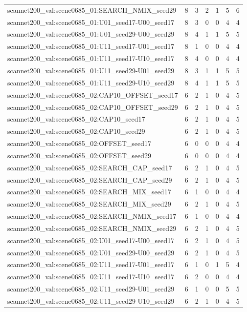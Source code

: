 \begin{table}[t]
\begin{tabular}{lrrrrrr}
scannet200\_val:scene0685\_01:SEARCH\_NMIX\_seed29 & 8 & 3 & 2 & 1 & 5 & 6 \\
scannet200\_val:scene0685\_01:U01\_seed17-U00\_seed17 & 8 & 3 & 0 & 0 & 4 & 4 \\
scannet200\_val:scene0685\_01:U01\_seed29-U00\_seed29 & 8 & 4 & 1 & 1 & 5 & 5 \\
scannet200\_val:scene0685\_01:U11\_seed17-U01\_seed17 & 8 & 1 & 0 & 0 & 4 & 4 \\
scannet200\_val:scene0685\_01:U11\_seed17-U10\_seed17 & 8 & 4 & 0 & 0 & 4 & 4 \\
scannet200\_val:scene0685\_01:U11\_seed29-U01\_seed29 & 8 & 3 & 1 & 1 & 5 & 5 \\
scannet200\_val:scene0685\_01:U11\_seed29-U10\_seed29 & 8 & 4 & 1 & 1 & 5 & 5 \\
scannet200\_val:scene0685\_02:CAP10\_OFFSET\_seed17 & 6 & 2 & 1 & 0 & 4 & 5 \\
scannet200\_val:scene0685\_02:CAP10\_OFFSET\_seed29 & 6 & 2 & 1 & 0 & 4 & 5 \\
scannet200\_val:scene0685\_02:CAP10\_seed17 & 6 & 2 & 1 & 0 & 4 & 5 \\
scannet200\_val:scene0685\_02:CAP10\_seed29 & 6 & 2 & 1 & 0 & 4 & 5 \\
scannet200\_val:scene0685\_02:OFFSET\_seed17 & 6 & 0 & 0 & 0 & 4 & 4 \\
scannet200\_val:scene0685\_02:OFFSET\_seed29 & 6 & 0 & 0 & 0 & 4 & 4 \\
scannet200\_val:scene0685\_02:SEARCH\_CAP\_seed17 & 6 & 2 & 1 & 0 & 4 & 5 \\
scannet200\_val:scene0685\_02:SEARCH\_CAP\_seed29 & 6 & 2 & 1 & 0 & 4 & 5 \\
scannet200\_val:scene0685\_02:SEARCH\_MIX\_seed17 & 6 & 1 & 0 & 0 & 4 & 4 \\
scannet200\_val:scene0685\_02:SEARCH\_MIX\_seed29 & 6 & 2 & 1 & 0 & 4 & 5 \\
scannet200\_val:scene0685\_02:SEARCH\_NMIX\_seed17 & 6 & 1 & 0 & 0 & 4 & 4 \\
scannet200\_val:scene0685\_02:SEARCH\_NMIX\_seed29 & 6 & 2 & 1 & 0 & 4 & 5 \\
scannet200\_val:scene0685\_02:U01\_seed17-U00\_seed17 & 6 & 2 & 1 & 0 & 4 & 5 \\
scannet200\_val:scene0685\_02:U01\_seed29-U00\_seed29 & 6 & 2 & 1 & 0 & 4 & 5 \\
scannet200\_val:scene0685\_02:U11\_seed17-U01\_seed17 & 6 & 1 & 0 & 1 & 5 & 4 \\
scannet200\_val:scene0685\_02:U11\_seed17-U10\_seed17 & 6 & 2 & 0 & 0 & 4 & 4 \\
scannet200\_val:scene0685\_02:U11\_seed29-U01\_seed29 & 6 & 1 & 0 & 0 & 5 & 5 \\
scannet200\_val:scene0685\_02:U11\_seed29-U10\_seed29 & 6 & 2 & 1 & 0 & 4 & 5 \\
\bottomrule
\end{tabular}
\end{table}
